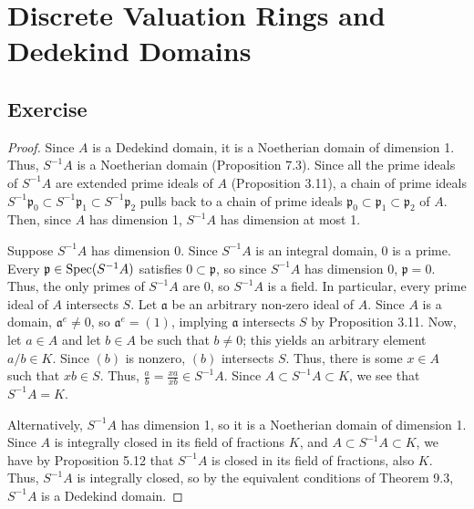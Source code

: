 \section{Discrete Valuation Rings and Dedekind Domains}

\subsection{Exercise}\label{9.1}

\begin{proof}
Since $A$ is a Dedekind domain, it is a Noetherian domain of dimension 1. Thus, $S^{-1}A$ is a Noetherian domain (Proposition 7.3).
Since all the prime ideals of $S^{-1}A$ are extended prime ideals of $A$ (Proposition 3.11), a chain of prime ideals 
$S^{-1}\mathfrak{p}_0 \subset S^{-1}\mathfrak{p}_1 \subset S^{-1}\mathfrak{p}_2$ pulls back to a chain of prime ideals
$\mathfrak{p}_0 \subset \mathfrak{p}_1 \subset \mathfrak{p}_2$ of $A$. Then, since $A$ has dimension 1, $S^{-1}A$ has dimension at
most 1.

Suppose $S^{-1}A$ has dimension $0$. Since $S^{-1}A$ is an integral domain, $0$ is a prime. Every $\mathfrak{p} \in \operatorname{Spec}(S^{-1}A)$
satisfies $0 \subset \mathfrak{p}$, so since $S^{-1}A$ has dimension $0$, $\mathfrak{p} = 0$. Thus, the only primes of $S^{-1}A$
are $0$, so $S^{-1}A$ is a field. In particular, every prime ideal of $A$ intersects $S$. Let $\mathfrak{a}$ be an arbitrary non-zero
ideal of $A$. Since $A$ is a domain, $\mathfrak{a}^e \neq 0$, so $\mathfrak{a}^e = (1)$, implying $\mathfrak{a}$ intersects $S$ by
Proposition 3.11. Now, let $a \in A$ and let $b \in A$ be such that $b \neq 0$; this yields an arbitrary element $a/b \in K$. Since $(b)$ 
is nonzero, $(b)$ intersects $S$. Thus, there is some $x \in A$ such that $xb \in S$. Thus, $\frac{a}{b} = \frac{xa}{xb} \in S^{-1}A$.
Since $A \subset S^{-1}A \subset K$, we see that $S^{-1}A = K$.

Alternatively, $S^{-1}A$ has dimension 1, so it is a Noetherian domain of dimension 1. Since $A$ is integrally closed in its field of fractions $K$,
and $A \subset S^{-1}A \subset K$, we have by Proposition 5.12 that $S^{-1}A$ is closed in its field of fractions, also $K$. Thus, $S^{-1}A$
is integrally closed, so by the equivalent conditions of Theorem 9.3, $S^{-1}A$ is a Dedekind domain.
\end{proof}

